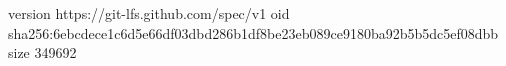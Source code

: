 version https://git-lfs.github.com/spec/v1
oid sha256:6ebcdece1c6d5e66df03dbd286b1df8be23eb089ce9180ba92b5b5dc5ef08dbb
size 349692
